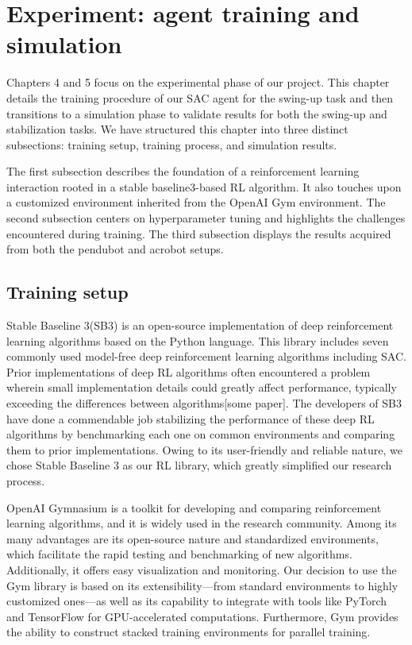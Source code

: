 \chapter{Experiment: agent training and simulation}
Chapters 4 and 5 focus on the experimental phase of our project. This chapter details the training procedure of our SAC agent for the swing-up task and then transitions to a simulation phase to validate results for both the swing-up and stabilization tasks. We have structured this chapter into three distinct subsections: training setup, training process, and simulation results.

The first subsection describes the foundation of a reinforcement learning interaction rooted in a stable baseline3-based RL algorithm. It also touches upon a customized environment inherited from the OpenAI Gym environment. The second subsection centers on hyperparameter tuning and highlights the challenges encountered during training. The third subsection displays the results acquired from both the pendubot and acrobot setups.

\section{Training setup}
Stable Baseline 3(SB3)\cite{stable-baselines3} is an open-source implementation of deep reinforcement learning algorithms based on the Python language. This library includes seven commonly used model-free deep reinforcement learning algorithms including SAC. Prior implementations of deep RL algorithms often encountered a problem wherein small implementation details could greatly affect performance, typically exceeding the differences between algorithms[some paper]. The developers of SB3 have done a commendable job stabilizing the performance of these deep RL algorithms by benchmarking each one on common environments and comparing them to prior implementations. Owing to its user-friendly and reliable nature, we chose Stable Baseline 3 as our RL library, which greatly simplified our research process.

OpenAI Gymnasium\cite{towers_gymnasium_2023} is a toolkit for developing and comparing reinforcement learning algorithms, and it is widely used in the research community. Among its many advantages are its open-source nature and standardized environments, which facilitate the rapid testing and benchmarking of new algorithms. Additionally, it offers easy visualization and monitoring. Our decision to use the Gym library is based on its extensibility—from standard environments to highly customized ones—as well as its capability to integrate with tools like PyTorch and TensorFlow for GPU-accelerated computations. Furthermore, Gym provides the ability to construct stacked training environments for parallel training.

